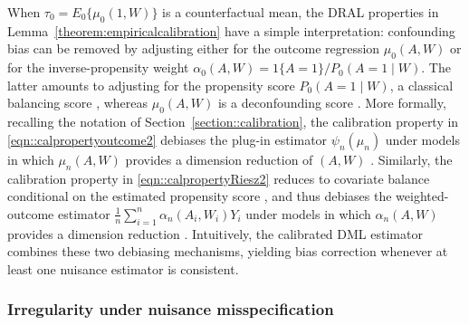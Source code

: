 \documentclass[11pt]{article}
\theoremstyle{plain}
\begin{document}
  
 
When \(\tau_0 = E_0\{\mu_0(1,W)\}\) is a counterfactual mean, the DRAL properties
in Lemma~\ref{theorem:empiricalcalibration} have a simple interpretation:
confounding bias can be removed by adjusting either for the outcome regression
\(\mu_0(A,W)\) or for the inverse-propensity weight
\(\alpha_0(A,W)=1\{A=1\}/P_0(A=1\mid W)\). The latter amounts to adjusting for
the propensity score \(P_0(A=1\mid W)\), a classical balancing score
\citep{rosenbaum1983central,imai2014covariate}, whereas \(\mu_0(A,W)\) is a
deconfounding score \citep{benkeser2020nonparametric,d2021deconfounding}. More formally, recalling the notation of Section~\ref{section::calibration},
the calibration property in \eqref{eqn::calpropertyoutcome2} debiases the
plug-in estimator \(\psi_n(\mu_n)\) under models in which \(\mu_n(A,W)\)
provides a dimension reduction of \((A,W)\) \citep{benkeser2020nonparametric}.
Similarly, the calibration property in \eqref{eqn::calpropertyRiesz2} reduces
to covariate balance conditional on the estimated propensity score
\citep{van_der_Laan2024stabilized}, and thus debiases the weighted-outcome
estimator \(\frac{1}{n}\sum_{i=1}^n \alpha_n(A_i,W_i)Y_i\) under models in which
\(\alpha_n(A,W)\) provides a dimension reduction \citep{rosenbaum1983central}.
Intuitively, the calibrated DML estimator combines these two debiasing
mechanisms, yielding bias correction whenever at least one nuisance estimator
is consistent.




\subsubsection{Irregularity under nuisance misspecification}
\end{document}
